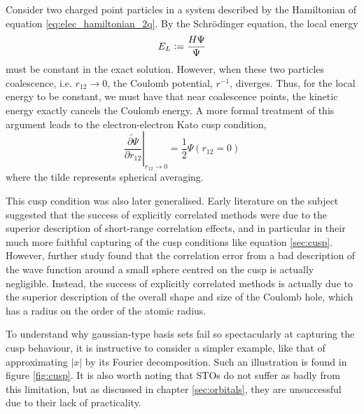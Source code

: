 Consider two charged point particles in a system described by the Hamiltonian of equation \eqref{eq:elec_hamiltonian_2q}. By the Schr\"odinger equation, the local energy
\begin{equation}
    E_L\mathrel{\mathop:}= \frac{H\Psi}{\Psi}
\end{equation}
must be constant in the exact solution. However, when these two particles coalescence, i.e. $r_{12}\to 0$, the Coulomb potential, $r^{-1}$, diverges. Thus, for the local energy to be constant, we must have that near coalescence points, the kinetic energy exactly cancels the Coulomb energy. A more formal treatment of this argument leads to the electron-electron Kato cusp condition,\cite{katoEigenfunctionsManyparticleSystems1957a}
\begin{equation}
    \label{eq:cusp}
    \left.\widetilde{\frac{\partial \Psi}{\partial r_{12}}}\right|_{r_{12}\to 0}
    = \frac 12 \Psi(r_{12}=0)
\end{equation}
where the tilde represents spherical averaging.

This cusp condition was also later generalised.\cite{packCuspConditionsMolecular1966,kurokawaChapterTwoGeneral2016}
Early literature on the subject suggested that the success of explicitly correlated methods were due to the superior description of short-range correlation effects, and in particular in their much more faithful capturing of the cusp conditions like equation \ref{sec:cusp}.\cite{roothaanAnalytical1960,watsonApproximate1960,weissConfiguration1961,schwartzGround1962}
However, further study found that the correlation error from a bad description of the wave function around a small sphere centred on the cusp is actually negligible.\cite{coulsonElectron1961,gilbertInterpretation1963,prendergastImpact2001,klopperR122007} Instead, the success of explicitly correlated methods is actually due to the superior description of the overall shape and size of the Coulomb hole, which has a radius on the order of the atomic radius.

To understand why gaussian-type basis sets fail so spectacularly at capturing the cusp behaviour, it is instructive to consider a simpler example, like that of approximating $|x|$ by its Fourier decomposition. Such an illustration is found in figure \ref{fig:cusp}. It is also worth noting that \glspl{STO} do not suffer as badly from this limitation\cite{kongExplicitly2012}, but as discussed in chapter \ref{sec:orbitals}, they are unsuccessful due to their lack of practicality.


